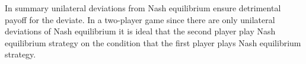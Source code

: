 In summary unilateral deviations from Nash equilibrium ensure detrimental payoff for the deviate. In a two-player game since there are only unilateral deviations of Nash equilibrium it is ideal that the second player play Nash equilibrium strategy on the condition that the first player plays Nash equilibrium strategy.


% 